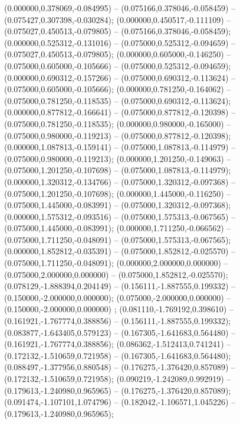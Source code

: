  (0.000000,0.378069,-0.084995) -- (0.075166,0.378046,-0.058459) -- (0.075427,0.307398,-0.030284);
 (0.000000,0.450517,-0.111109) -- (0.075027,0.450513,-0.079805) -- (0.075166,0.378046,-0.058459);
 (0.000000,0.525312,-0.131016) -- (0.075000,0.525312,-0.094659) -- (0.075027,0.450513,-0.079805);
 (0.000000,0.605000,-0.146250) -- (0.075000,0.605000,-0.105666) -- (0.075000,0.525312,-0.094659);
 (0.000000,0.690312,-0.157266) -- (0.075000,0.690312,-0.113624) -- (0.075000,0.605000,-0.105666);
 (0.000000,0.781250,-0.164062) -- (0.075000,0.781250,-0.118535) -- (0.075000,0.690312,-0.113624);
 (0.000000,0.877812,-0.166641) -- (0.075000,0.877812,-0.120398) -- (0.075000,0.781250,-0.118535);
 (0.000000,0.980000,-0.165000) -- (0.075000,0.980000,-0.119213) -- (0.075000,0.877812,-0.120398);
 (0.000000,1.087813,-0.159141) -- (0.075000,1.087813,-0.114979) -- (0.075000,0.980000,-0.119213);
 (0.000000,1.201250,-0.149063) -- (0.075000,1.201250,-0.107698) -- (0.075000,1.087813,-0.114979);
 (0.000000,1.320312,-0.134766) -- (0.075000,1.320312,-0.097368) -- (0.075000,1.201250,-0.107698);
 (0.000000,1.445000,-0.116250) -- (0.075000,1.445000,-0.083991) -- (0.075000,1.320312,-0.097368);
 (0.000000,1.575312,-0.093516) -- (0.075000,1.575313,-0.067565) -- (0.075000,1.445000,-0.083991);
 (0.000000,1.711250,-0.066562) -- (0.075000,1.711250,-0.048091) -- (0.075000,1.575313,-0.067565);
 (0.000000,1.852812,-0.035391) -- (0.075000,1.852812,-0.025570) -- (0.075000,1.711250,-0.048091);
 (0.000000,2.000000,0.000000) -- (0.075000,2.000000,0.000000) -- (0.075000,1.852812,-0.025570);
 (0.078129,-1.888394,0.204149) -- (0.156111,-1.887555,0.199332) -- (0.150000,-2.000000,0.000000);
 (0.075000,-2.000000,0.000000) -- (0.150000,-2.000000,0.000000) ;
 (0.081110,-1.769192,0.398610) -- (0.161921,-1.767774,0.388856) -- (0.156111,-1.887555,0.199332);
 (0.083877,-1.643405,0.579123) -- (0.167305,-1.641683,0.564480) -- (0.161921,-1.767774,0.388856);
 (0.086362,-1.512413,0.741241) -- (0.172132,-1.510659,0.721958) -- (0.167305,-1.641683,0.564480);
 (0.088497,-1.377956,0.880548) -- (0.176275,-1.376420,0.857089) -- (0.172132,-1.510659,0.721958);
 (0.090219,-1.242089,0.992919) -- (0.179613,-1.240980,0.965965) -- (0.176275,-1.376420,0.857089);
 (0.091474,-1.107101,1.074796) -- (0.182042,-1.106571,1.045226) -- (0.179613,-1.240980,0.965965);
